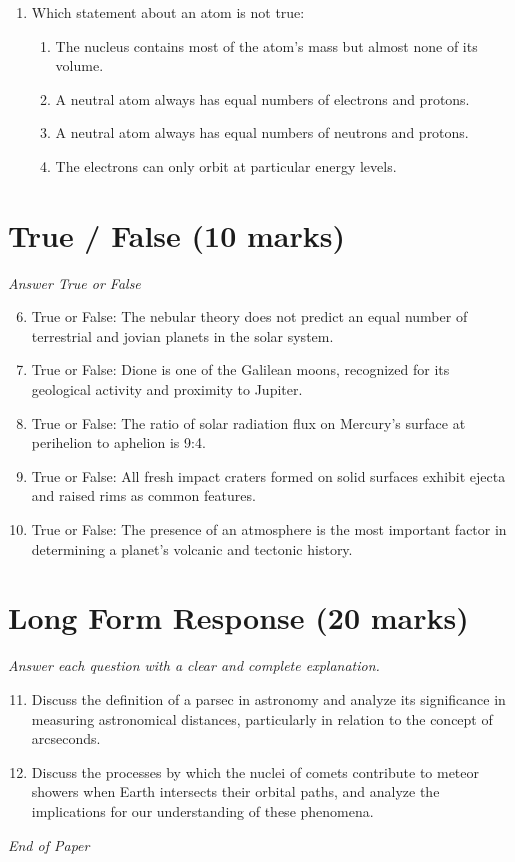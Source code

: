 \documentclass[12pt]{article}
\begin{document}
\begin{enumerate}[label=\arabic*.]
\begin{enumerate}[label=(\alph*)]
    \item Meteor Crater in Arizona.
\end{enumerate}
\item Which statement about an atom is not true:
\begin{enumerate}[label=(\alph*)]
    \item The nucleus contains most of the atom's mass but almost none of its volume.
    \item A neutral atom always has equal numbers of electrons and protons.
    \item A neutral atom always has equal numbers of neutrons and protons.
    \item The electrons can only orbit at particular energy levels.
\end{enumerate}
\end{enumerate}

\section*{True / False (10 marks)}
\textit{Answer True or False}
\begin{enumerate}[label=\arabic*.]
\setcounter{enumi}{5}
\item True or False: The nebular theory does not predict an equal number of terrestrial and jovian planets in the solar system.
\item True or False: Dione is one of the Galilean moons, recognized for its geological activity and proximity to Jupiter.
\item True or False: The ratio of solar radiation flux on Mercury's surface at perihelion to aphelion is 9:4.
\item True or False: All fresh impact craters formed on solid surfaces exhibit ejecta and raised rims as common features.
\item True or False: The presence of an atmosphere is the most important factor in determining a planet's volcanic and tectonic history.
\end{enumerate}

\section*{Long Form Response (20 marks)}
\textit{Answer each question with a clear and complete explanation.}
\begin{enumerate}[label=\arabic*.]
\setcounter{enumi}{10}
\item Discuss the definition of a parsec in astronomy and analyze its significance in measuring astronomical distances, particularly in relation to the concept of arcseconds.
\item Discuss the processes by which the nuclei of comets contribute to meteor showers when Earth intersects their orbital paths, and analyze the implications for our understanding of these phenomena.
\end{enumerate}

\vfill
\noindent\textit{End of Paper}
\end{document}
